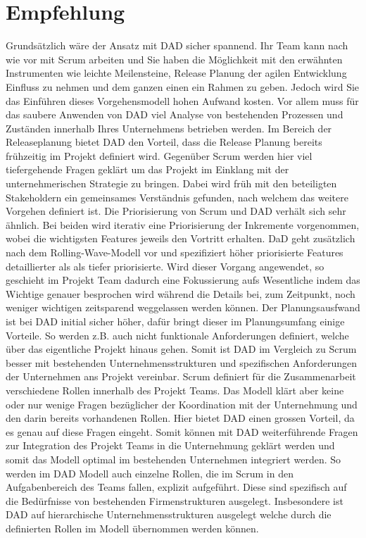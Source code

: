 \section{Empfehlung}

Grundsätzlich wäre der Ansatz mit DAD sicher spannend. Ihr Team kann nach wie vor mit Scrum arbeiten und Sie haben die Möglichkeit mit den erwähnten Instrumenten wie leichte Meilensteine, Release Planung der agilen Entwicklung Einfluss zu nehmen und dem ganzen einen ein Rahmen zu geben. \newline
Jedoch wird Sie das Einführen dieses Vorgehensmodell hohen Aufwand kosten. Vor allem muss für das saubere Anwenden von DAD viel Analyse von bestehenden Prozessen und Zuständen innerhalb Ihres Unternehmens betrieben werden.
Im Bereich der Releaseplanung bietet DAD den Vorteil, dass die Release Planung bereits frühzeitig im Projekt definiert wird. Gegenüber Scrum werden hier viel tiefergehende Fragen geklärt um das Projekt im Einklang mit der unternehmerischen Strategie zu bringen. Dabei wird früh mit den beteiligten Stakeholdern ein gemeinsames Verständnis gefunden, nach welchem das weitere Vorgehen definiert ist. \newline
Die Priorisierung von Scrum und DAD verhält sich sehr ähnlich. Bei beiden wird iterativ eine Priorisierung der Inkremente vorgenommen, wobei die wichtigsten Features jeweils den Vortritt erhalten. DaD geht zusätzlich nach dem Rolling-Wave-Modell vor und spezifiziert höher priorisierte Features detaillierter als als tiefer priorisierte. Wird dieser Vorgang angewendet, so geschieht im Projekt Team dadurch eine Fokussierung aufs Wesentliche indem das Wichtige genauer besprochen wird während die Details bei, zum Zeitpunkt, noch weniger wichtigen zeitsparend weggelassen werden können.
Der Planungsausfwand ist bei DAD initial sicher höher, dafür bringt dieser im Planungsumfang einige Vorteile. So werden z.B. auch nicht funktionale Anforderungen definiert, welche über das eigentliche Projekt hinaus gehen. Somit ist DAD im Vergleich zu Scrum besser mit bestehenden Unternehmensstrukturen und spezifischen Anforderungen der Unternehmen ans Projekt vereinbar. \newline
Scrum definiert für die Zusammenarbeit verschiedene Rollen innerhalb des Projekt Teams. Das Modell klärt aber keine oder nur wenige Fragen bezüglicher der Koordination mit der Unternehmung und den darin bereits vorhandenen Rollen. Hier bietet DAD einen grossen Vorteil, da es genau auf diese Fragen eingeht. Somit können mit DAD weiterführende Fragen zur Integration des Projekt Teams in die Unternehmung geklärt werden und somit das Modell optimal im bestehenden Unternehmen integriert werden. So werden im DAD Modell auch einzelne Rollen, die im Scrum in den Aufgabenbereich des Teams fallen, explizit aufgeführt. Diese sind spezifisch auf die Bedürfnisse von bestehenden Firmenstrukturen ausgelegt. Insbesondere ist DAD auf hierarchische Unternehmensstrukturen ausgelegt welche durch die definierten Rollen im Modell übernommen werden können.\newline
